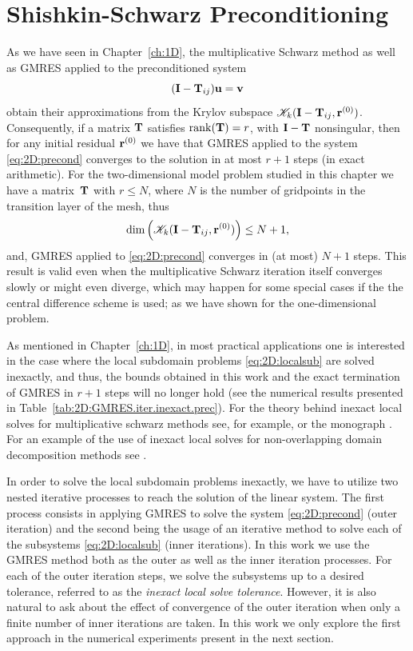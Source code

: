 \section{Shishkin-Schwarz Preconditioning}
\label{2D:precon}

As we have seen in Chapter~\ref{ch:1D}, the multiplicative
Schwarz method as well as GMRES applied to the preconditioned system
\begin{equation}\label{eq:2D:precond}
(\mathbf{I}-\mathbf{T}_{ij})\mathbf{u}=\mathbf{v}
\end{equation}
obtain their approximations from the Krylov subspace
$\mathscr{K}_k(\mathbf{I}-\mathbf{T}_{ij},\mathbf{r}^{(0)})$.
Consequently, if a matrix $\mathbf{T}$ satisfies $\mathrm{rank}(\mathbf{T})=r$, with $\mathbf{I}-\mathbf{T}$
nonsingular, then for any initial residual $\mathbf{r}^{(0)}$ we have that GMRES
applied to the system \eqref{eq:2D:precond} converges to the solution in at
most $r+1$ steps (in exact arithmetic). For the two-dimensional model problem
studied in this chapter we have a matrix~$\mathbf{T}$ with $r\leq N$, where $N$ is the
number of gridpoints in the transition layer of the mesh, thus
\begin{equation}\label{eq:2D:K_rank}
\dim \left(\mathscr{K}_k(\mathbf{I}-\mathbf{T}_{ij},\mathbf{r}^{(0)})\right) \leq N+1,
\end{equation}
and, GMRES applied to \eqref{eq:2D:precond} converges in (at most) $N+1$ steps.
This result is valid even when the multiplicative Schwarz iteration itself
converges slowly or might even diverge, which may happen for some special cases
if the the central difference scheme is used; as we have shown for the
one-dimensional problem.

As mentioned in Chapter~\ref{ch:1D}, in most practical applications one is
interested in the case where the local subdomain problems \eqref{eq:2D:localsub}
are solved inexactly, and thus, the bounds obtained in this work and the exact
termination of GMRES in $r+1$ steps will no longer hold (see the numerical
results presented in Table~\ref{tab:2D:GMRES.iter.inexact.prec}). For the
theory behind inexact local solves for multiplicative schwarz methods see, for
example, \cite{BenFroNabSzy01} or the monograph \cite{SmiBjoGro96}. For an
example of the use of inexact local solves for non-overlapping domain
decomposition methods see \cite{BraPasVass98}.

In order to solve the local subdomain problems inexactly, we have to utilize
two nested iterative processes to reach the solution of the linear system.
The first process consists in applying GMRES to solve the system
\eqref{eq:2D:precond} (outer iteration) and the second being the usage
of an iterative method to solve each of the subsystems \eqref{eq:2D:localsub}
(inner iterations). In this work we use the GMRES method both as the outer as
well as the inner iteration processes. For each of the outer iteration steps,
we solve the subsystems up to a desired tolerance, referred to as the
\textit{inexact local solve tolerance}. However, it is also natural to ask
about the effect of convergence of the outer iteration when only a finite
number of inner iterations are taken. In this work we only explore the first
approach in the numerical experiments present in the next section.

